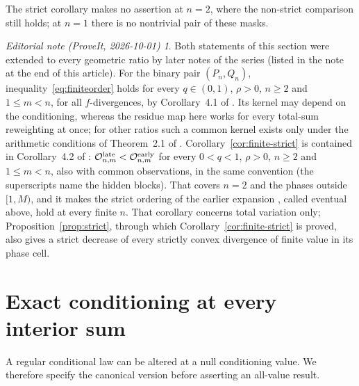 \documentclass[11pt,a4paper]{article}
\theoremstyle{remark}\newtheorem*{ednote}{Editorial note (ProveIt, 2026-10-01)}
\begin{document}
The strict corollary makes no assertion at $n=2$, where the non-strict comparison still holds; at $n=1$ there is no nontrivial pair of these masks.
\begin{ednote}
Both statements of this section were extended to every geometric ratio by
later notes of the series (listed in the note at the end of this article).
For the binary pair $(P_n,Q_n)$, inequality~\eqref{eq:finiteorder} holds for
every $q\in(0,1)$, $\rho>0$, $n\ge2$ and $1\le m<n$, for all $f$-divergences,
by Corollary~4.1 of . Its kernel may
depend on the conditioning, whereas the residue map here works for every
total-sum reweighting at once; for other ratios such a common kernel exists
only under the arithmetic conditions of Theorem~2.1 of
. Corollary~\ref{cor:finite-strict}
is contained in Corollary~4.2 of :
$\mathcal O^{\rm late}_{n,m}<\mathcal O^{\rm early}_{n,m}$ for every $0<q<1$,
$\rho>0$, $n\ge2$ and $1\le m<n$, also with common observations, in the same
convention (the superscripts name the hidden blocks). That covers $n=2$ and
the phases outside $[1,M)$, and it makes the strict ordering of the earlier
expansion \cite{second}, called eventual above, hold at every finite $n$. That
corollary concerns total variation only; Proposition~\ref{prop:strict},
through which Corollary~\ref{cor:finite-strict} is proved, also gives a strict
decrease of every strictly convex divergence of finite value in its phase
cell.
\end{ednote}

\section{Exact conditioning at every interior sum}\label{sec:exact}
A regular conditional law can be altered at a null conditioning value. We therefore specify the canonical version before asserting an all-value result.
\end{document}
